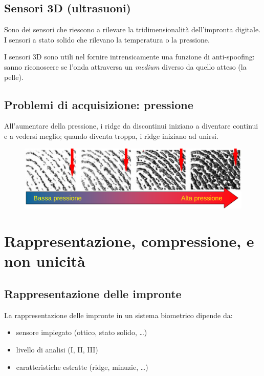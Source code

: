 \documentclass{report}
\begin{document}
\section{Sensori 3D (ultrasuoni)}

Sono dei sensori che riescono a rilevare la tridimensionalità dell'impronta digitale.
I sensori a stato solido che rilevano la temperatura o la pressione.

\noindent I sensori 3D sono utili nel fornire intrensicamente una funzione di anti-spoofing: 
sanno riconoscere se l'onda attraversa un \textit{medium} diverso da quello atteso (la pelle).

\section{Problemi di acquisizione: pressione}

All'aumentare della pressione, i ridge da discontinui iniziano a diventare continui e a vedersi
meglio; quando diventa troppa, i ridge iniziano ad unirsi.
\begin{figure}[ht]
    \centering
    \includegraphics[width=0.75\linewidth]{images/pressione.png}
\end{figure}




\chapter{Rappresentazione, compressione,  e non unicità}

\section{Rappresentazione delle impronte}

La rappresentazione delle impronte in un sistema biometrico dipende da:
\begin{itemize}
    \item sensore impiegato (ottico, stato solido, \dots)
    \item livello di analisi (I, II, III)
    \item caratteristiche estratte (ridge, minuzie, \dots)
\end{itemize}
\end{document}
